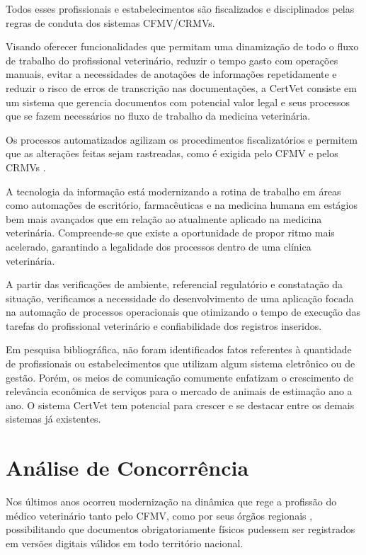 \documentclass[
    12pt,               %
    openright,          %
    oneside,
    a4paper,            %
    BIBLATEX,           %
    TODO,               %
    english,            %
    brazil              %
    ]{ifsp-spo-inf-ctds}
\begin{document}
    Todos esses profissionais e estabelecimentos são fiscalizados e disciplinados pelas regras de conduta dos sistemas CFMV/CRMVs.
    
    Visando oferecer funcionalidades que permitam uma dinamização de todo o fluxo de trabalho do profissional veterinário, reduzir o tempo gasto com operações manuais, evitar a necessidades de anotações de informações repetidamente e reduzir o risco de erros de transcrição nas documentações, a CertVet consiste em um sistema que gerencia documentos com potencial valor legal e seus processos que se fazem necessários no fluxo de trabalho da medicina veterinária.
    
    Os processos automatizados agilizam os procedimentos fiscalizatórios e permitem que as alterações feitas sejam rastreadas, como é exigida pelo CFMV e pelos CRMVs .
    
    A tecnologia da informação está modernizando a rotina de trabalho em áreas como automações de escritório, farmacêuticas e na medicina humana em estágios bem mais avançados que em relação ao atualmente aplicado na medicina veterinária. Compreende-se que existe a oportunidade de propor ritmo mais acelerado, garantindo a legalidade dos processos dentro de uma clínica veterinária.
    
    A partir das verificações de ambiente, referencial regulatório e constatação da situação, verificamos a necessidade do desenvolvimento de uma aplicação focada na automação de processos operacionais que otimizando o tempo de execução das tarefas do profissional veterinário e confiabilidade dos registros inseridos.
    
    Em pesquisa bibliográfica, não foram identificados fatos referentes à quantidade de profissionais ou estabelecimentos que utilizam algum sistema eletrônico ou de gestão. Porém, os meios de comunicação comumente enfatizam o crescimento de relevância econômica de serviços para o mercado de animais de estimação ano a ano. O sistema CertVet tem potencial para crescer e se destacar entre os demais sistemas já existentes.

    \section{Análise de Concorrência} \label{analise_concorrência}

        Nos últimos anos ocorreu modernização na dinâmica que rege a profissão do médico veterinário tanto pelo CFMV, como por seus órgãos regionais  , possibilitando que documentos obrigatoriamente físicos pudessem ser registrados em versões digitais válidos em todo território nacional. 
        
\end{document}
